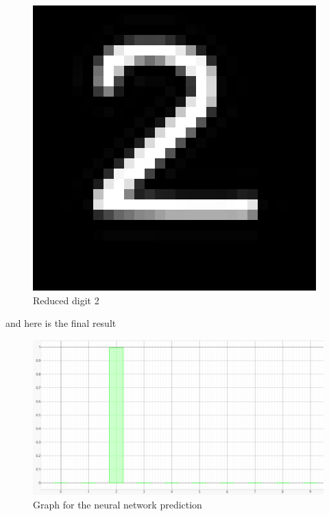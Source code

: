 \documentclass[a4paper, twocolumn, twoside]{article}
\begin{document}
	\begin{figure}[H]
		\begin{center}
			\includegraphics[width=\columnwidth]{images/2_reduced.png}
		\end{center}
		\caption{Reduced digit 2}\label{fig:2_reduced}
	\end{figure}
	and here is the final result
	\begin{figure}[H]
	\begin{center}
		\includegraphics[width=\columnwidth]{images/2_final.png}
	\end{center}
	\caption{Graph for the neural network prediction}\label{fig_2_final}
	\end{figure}
\end{document}
